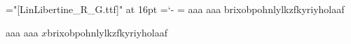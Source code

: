   
\font\lb="[LinLibertine_R_G.ttf]" at 16pt \hyphenchar\lb=`-
\hsize=100pt \parindent=0pt   \hfuzz=\maxdimen
\lb aaa aaa brixo\-bpohnlylkzfkyriyholaaf\par
\lb aaa aaa $x$brixo\-bpohnlylkzfkyriyholaaf\par
\bye
